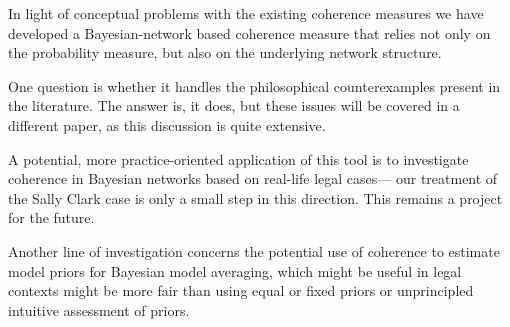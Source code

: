 \documentclass[10pt,]{scrartcl}
\begin{document}
\begin{table}[H]
        \caption{Coherence scores for the Beatles and witness scenarios.}
    \label{tab:witnesses}
\end{table}














In light of conceptual problems with the existing coherence measures we have developed a Bayesian-network based coherence measure that relies not only on the probability measure, but also on the underlying network structure. 

One question is whether it handles the philosophical counterexamples present in the literature. The answer is, it does, but these issues will be covered in a different paper, as this discussion is quite extensive. 

A potential, more practice-oriented  application of this tool is to investigate coherence in  Bayesian networks based on real-life legal cases--- our treatment of the Sally Clark case is only a small step in this direction. This remains a project for the future.

Another line of investigation concerns
the potential use of coherence to    estimate model priors for Bayesian model averaging, which might be useful in legal contexts might be more fair  than using equal or fixed priors or unprincipled intuitive assessment of priors. 































\end{document}
